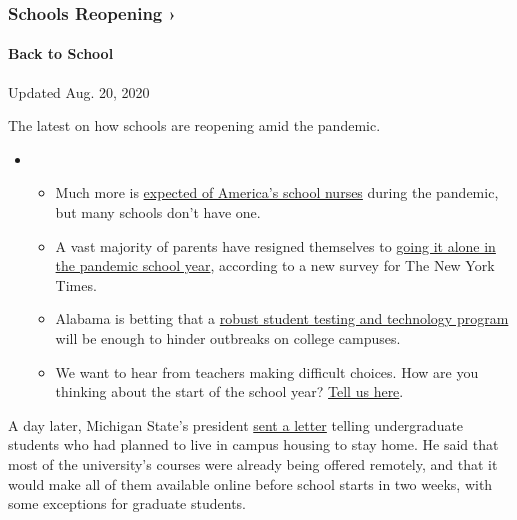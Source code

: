 \hypertarget{schools-reopening-}{%
\subsubsection{Schools Reopening ›}\label{schools-reopening-}}

\hypertarget{back-to-school}{%
\paragraph{Back to School}\label{back-to-school}}

Updated Aug. 20, 2020

The latest on how schools are reopening amid the pandemic.

\begin{itemize}
\item
  \begin{itemize}
  \tightlist
  \item
    Much more is
    \href{https://www.nytimes3xbfgragh.onion/2020/08/20/us/schools-reopening-nurses-covid.html?action=click\&pgtype=Article\&state=default\&region=MAIN_CONTENT_3\&context=storylines_keepup}{expected
    of America's school nurses} during the pandemic, but many schools
    don't have one.
  \item
    A vast majority of parents have resigned themselves to
    \href{https://www.nytimes3xbfgragh.onion/2020/08/19/us/colleges-closing-covid.html?action=click\&pgtype=Article\&state=default\&region=MAIN_CONTENT_3\&context=storylines_keepup}{going
    it alone in the pandemic school year}, according to a new survey for
    The New York Times.
  \item
    Alabama is betting that a
    \href{https://www.nytimes3xbfgragh.onion/2020/08/19/business/alabama-uab-coronavirus-tests.html?action=click\&pgtype=Article\&state=default\&region=MAIN_CONTENT_3\&context=storylines_keepup}{robust
    student testing and technology program} will be enough to hinder
    outbreaks on college campuses.
  \item
    We want to hear from teachers making difficult choices. How are you
    thinking about the start of the school year?
    \href{https://www.nytimes3xbfgragh.onion/2020/08/19/us/teachers-school-reopenings.html?action=click\&pgtype=Article\&state=default\&region=MAIN_CONTENT_3\&context=storylines_keepup}{Tell
    us here}.
  \end{itemize}
\end{itemize}

A day later, Michigan State's president
\href{https://president.msu.edu/communications/messages-statements/2020_community_letters/2020-08-18-plans-change.html}{sent
a letter} telling undergraduate students who had planned to live in
campus housing to stay home. He said that most of the university's
courses were already being offered remotely, and that it would make all
of them available online before school starts in two weeks, with some
exceptions for graduate students.

